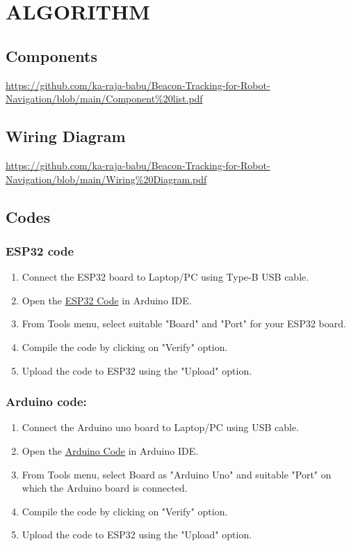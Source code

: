 \documentclass[journal,12pt,twocolumn]{IEEEtran}
\begin{document}
\section{ALGORITHM}
\subsection{\textbf{Components}}
\url{https://github.com/ka-raja-babu/Beacon-Tracking-for-Robot-Navigation/blob/main/Component%20list.pdf}
\subsection{\textbf{Wiring Diagram}}
\url{https://github.com/ka-raja-babu/Beacon-Tracking-for-Robot-Navigation/blob/main/Wiring%20Diagram.pdf}
\subsection{\textbf{Codes}}
\subsubsection{\textbf{ESP32 code}}
\begin{enumerate}
    \item Connect the ESP32 board to Laptop/PC using Type-B USB cable.
    \item Open the \href{https://github.com/ka-raja-babu/Beacon-Tracking-for-Robot-Navigation/blob/main/Codes/ESP32_Code.ino}{ESP32 Code} in Arduino IDE. 
    \item From Tools menu, select suitable "Board" and "Port" for your ESP32 board.
    \item Compile the code by clicking on "Verify" option.
    \item Upload the code to ESP32 using the "Upload" option.
\end{enumerate}
\subsubsection{\textbf{Arduino code:}}
\begin{enumerate}
    \item Connect the Arduino uno board to Laptop/PC using USB cable.
    \item Open the \href{https://github.com/ka-raja-babu/Beacon-Tracking-for-Robot-Navigation/blob/main/Codes/ESP32_Code.ino}{Arduino Code} in Arduino IDE. 
    \item From Tools menu, select Board as "Arduino Uno" and suitable "Port" on which the Arduino board is connected.
    \item Compile the code by clicking on "Verify" option.
    \item Upload the code to ESP32 using the "Upload" option.
\end{enumerate}
\end{document}
